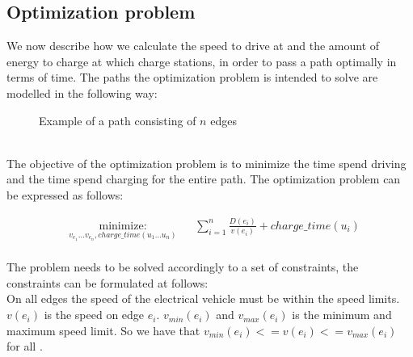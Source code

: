 \subsection{Optimization problem}
We now describe how we calculate the speed to drive at and the amount of energy to charge at which charge stations, in order to pass a path optimally in terms of time. The paths the optimization problem is intended to solve are modelled in the following way: \\
\begin{figure}[h!]
\centering
    \caption{Example of a path consisting of $n$ edges} \label{fig:pathexample}
\end{figure} \\

The objective of the optimization problem is to minimize the time spend driving 
and the time spend charging for the entire path. The optimization problem can be expressed as follows:

\begin{equation}
	\begin{aligned} & \underset{v_{e_{1}} \dots v_{e_{n}}, charge\_time(u_1 \dots u_n)}
	{\text{minimize:}}
	& & \sum_{i=1}^{n} \frac{D(e_i)}{v(e_i)} + charge\_time(u_i) \\
	\end{aligned}
\end{equation}\label{eq:objfunction}

The problem needs to be solved accordingly to a set of constraints, the constraints can be formulated at follows: \\
On all edges the speed of the electrical vehicle must be within the speed limits. $v(e_i)$ is the speed on edge $e_i$. $v_{min}(e_i)$ and $v_{max}(e_i)$ is the minimum and maximum speed limit. So we have that $v_{min}(e_i) <= v(e_i) <= v_{max}(e_i)$ for all .
 
